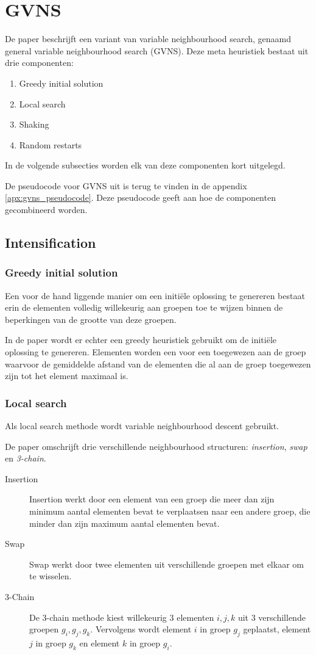 \documentclass[pdftex,12pt,a4paper]{article}
\begin{document}
\section{GVNS}
De paper beschrijft een variant van variable neighbourhood search, genaamd general variable neighbourhood search (GVNS). Deze meta heuristiek bestaat uit drie componenten:

\begin{enumerate}
\item Greedy initial solution
\item Local search
\item Shaking
\item Random restarts
\end{enumerate}

In de volgende subsecties worden elk van deze componenten kort uitgelegd.

De pseudocode voor GVNS uit \cite{Urosevic} is terug te vinden in de appendix \ref{apx:gvns_pseudocode}. Deze pseudocode geeft aan hoe de componenten gecombineerd worden.

\subsection{Intensification}
\subsubsection{Greedy initial solution}
Een voor de hand liggende manier om een initi\"ele oplossing te genereren bestaat erin de elementen volledig willekeurig aan groepen toe te wijzen binnen de beperkingen van de grootte van deze groepen.

In de paper wordt er echter een greedy heuristiek gebruikt om de initi\"ele oplossing te genereren.
Elementen worden een voor een toegewezen aan de groep waarvoor de gemiddelde afstand van de elementen die al aan de groep toegewezen zijn tot het element maximaal is.

\subsubsection{Local search}
Als local search methode wordt variable neighbourhood descent gebruikt.

De paper omschrijft drie verschillende neighbourhood structuren: \emph{insertion}, \emph{swap} en \emph{3-chain}.

\begin{description}
\item[Insertion] Insertion werkt door een element van een groep die meer dan zijn minimum aantal elementen bevat te verplaatsen naar een andere groep, die minder dan zijn maximum aantal elementen bevat.
\item[Swap] Swap werkt door twee elementen uit verschillende groepen met elkaar om te wisselen.
\item[3-Chain] De 3-chain methode kiest willekeurig 3 elementen $i, j, k$ uit 3 verschillende groepen $g_{i}, g_{j}, g_{k}$. Vervolgens wordt element $i$ in groep $g_{j}$ geplaatst, element $j$ in groep $g_{k}$ en element $k$ in groep $g_{i}$.
\end{description}
\end{document}
